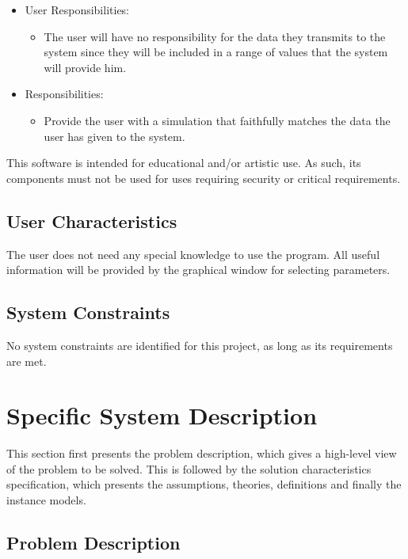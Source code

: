 \documentclass[12pt]{article}
\begin{document}
\begin{itemize}
\item User Responsibilities:
\begin{itemize}
\item The user will have no responsibility for the data they transmits to the system since they will be included in a range of values 
that the system will provide him.
\end{itemize}
\item \progname{} Responsibilities:
\begin{itemize}
\item Provide the user with a simulation that faithfully matches the data the user has given to the system.
\end{itemize}
\end{itemize}

This software is intended for educational and/or artistic use. 
As such, its components must not be used for uses requiring security or critical requirements.

\subsection{User Characteristics} \label{SecUserCharacteristics}

The user does not need any special knowledge to use the program. 
All useful information will be provided by the graphical window for selecting parameters.

\subsection{System Constraints}

No system constraints are identified for this project, as long as its requirements are met.

\section{Specific System Description}

This section first presents the problem description, which gives a high-level
view of the problem to be solved.  This is followed by the solution characteristics
specification, which presents the assumptions, theories, definitions and finally
the instance models.

\subsection{Problem Description} \label{Sec_pd}
\end{document}
